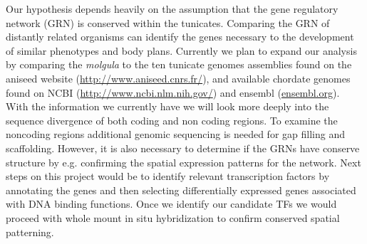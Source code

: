 Our hypothesis depends heavily on the assumption that the gene regulatory network (GRN) is conserved within the tunicates. Comparing the GRN of distantly related organisms can identify the genes necessary to the development of similar phenotypes and body plans. Currently we plan to expand our analysis by comparing the \textit{molgula} to the ten tunicate genomes assemblies found on the aniseed website (\url{http://www.aniseed.cnrs.fr/}), and available chordate genomes found on NCBI (\url{http://www.ncbi.nlm.nih.gov/}) and ensembl (\url{ensembl.org}). With the information we currently have we will look more deeply into the sequence divergence of both coding and non coding regions. To examine the noncoding regions additional genomic sequencing is needed for gap filling and scaffolding. However, it is also necessary to determine if the GRNs have conserve structure by e.g. confirming the spatial expression patterns for the network. Next steps on this project would be to identify relevant transcription factors by annotating the genes and then selecting differentially expressed genes associated with DNA binding functions. Once we identify our candidate TFs we would proceed with whole mount in situ hybridization to confirm conserved spatial patterning.

